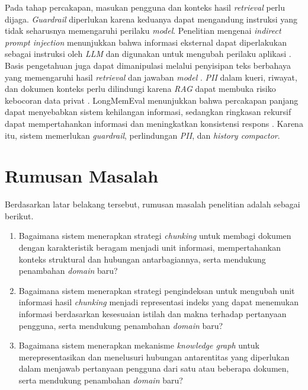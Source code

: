 Pada tahap percakapan, masukan pengguna dan konteks hasil \emph{retrieval} perlu
dijaga. \emph{Guardrail} diperlukan karena keduanya dapat mengandung instruksi
yang tidak seharusnya memengaruhi perilaku \emph{model}. Penelitian mengenai
\emph{indirect prompt injection} menunjukkan bahwa informasi eksternal dapat
diperlakukan sebagai instruksi oleh \emph{LLM} dan digunakan untuk mengubah perilaku
aplikasi \parencite{greshakeIndirectPromptInjection2023}. Basis pengetahuan juga
dapat dimanipulasi melalui penyisipan teks berbahaya yang memengaruhi hasil
\emph{retrieval} dan jawaban \emph{model} \parencite{zouPoisonedRAG2025}. \emph{PII} dalam kueri,
riwayat, dan dokumen konteks perlu dilindungi karena \emph{RAG} dapat membuka risiko
kebocoran data privat \parencite{mccallisterGuideProtectingPII2010,
zengGoodBadPrivacyRAG2024}. LongMemEval menunjukkan bahwa percakapan panjang
dapat menyebabkan sistem kehilangan informasi, sedangkan ringkasan rekursif dapat
mempertahankan informasi dan meningkatkan konsistensi respons
\parencite{wuLongMemEval2025,wangRecursivelySummarizingLongTerm2023}. Karena itu,
sistem memerlukan \emph{guardrail}, perlindungan \emph{PII}, dan \emph{history compactor}.

\section{Rumusan Masalah}

\noindent Berdasarkan latar belakang tersebut, rumusan masalah penelitian adalah sebagai
berikut.

\begin{enumerate}
    \item Bagaimana sistem menerapkan strategi \emph{chunking} untuk membagi dokumen dengan karakteristik beragam menjadi unit informasi, mempertahankan konteks struktural dan hubungan antarbagiannya, serta mendukung penambahan \emph{domain} baru?
    \item Bagaimana sistem menerapkan strategi pengindeksan untuk mengubah unit informasi hasil \emph{chunking} menjadi representasi indeks yang dapat menemukan informasi berdasarkan kesesuaian istilah dan makna terhadap pertanyaan pengguna, serta mendukung penambahan \emph{domain} baru?
    \item Bagaimana sistem menerapkan mekanisme \emph{knowledge graph} untuk merepresentasikan dan menelusuri hubungan antarentitas yang diperlukan dalam menjawab pertanyaan pengguna dari satu atau beberapa dokumen, serta mendukung penambahan \emph{domain} baru?
\end{enumerate}

